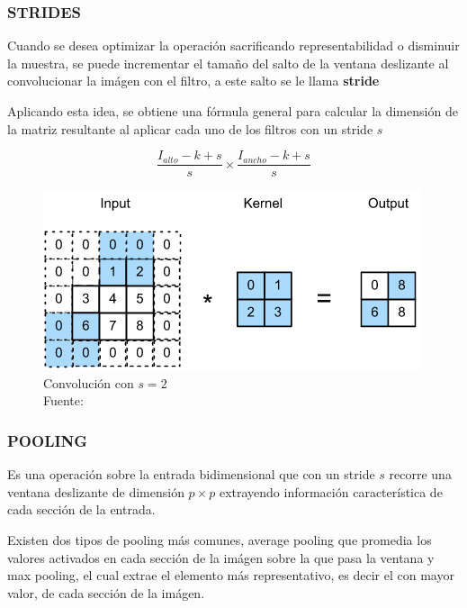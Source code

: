         \subsubsection{STRIDES}
        Cuando se desea optimizar la operación sacrificando representabilidad o disminuir la muestra, se puede incrementar el tamaño del salto de la ventana deslizante al convolucionar la imágen con el filtro, a este salto se le llama \textbf{stride}
        
        
        Aplicando esta idea, se obtiene una fórmula general para calcular la dimensión de la matriz resultante al aplicar cada uno de los filtros con un stride $s$
        
        $$\frac{I_{alto} - k + s}{s} \times \frac{I_{ancho} - k + s}{s}$$ 
        
        \begin{figure}[H]
            \centering
            \includegraphics[scale=0.6]{imagenes/stride}
            \caption{Convolución con $s=2$\\ Fuente: \citep{zhang2020dive}}
        \end{figure}
        \subsubsection{POOLING}
        Es una operación sobre la entrada bidimensional que con un stride $s$ recorre una ventana deslizante de dimensión $p \times p$ extrayendo información característica de cada sección de la entrada.
        
        Existen dos tipos de pooling más comunes, average pooling que promedia los valores activados en cada sección de la imágen sobre la que pasa la ventana y max pooling, el cual extrae el elemento más representativo, es decir el con mayor valor, de cada sección de la imágen.
        
